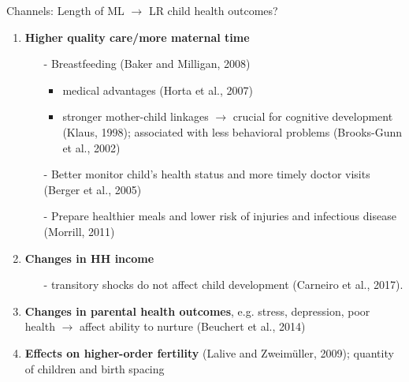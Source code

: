 \documentclass{beamer} %
\begin{document}
\begin{frame}
\begin{block}{Channels: Length of ML $\rightarrow$ LR child health outcomes?}
\begin{enumerate}
\item \textbf{Higher quality care/more maternal time} 
\begin{itemize}
\item[-]Breastfeeding (Baker and Milligan, 2008)
\begin{itemize}
\item medical advantages (Horta et al., 2007)
\item stronger mother-child linkages $\rightarrow$ crucial for cognitive development (Klaus, 1998); associated with less behavioral problems (Brooks-Gunn et al., 2002)
\end{itemize}
\item[-]Better monitor child's health status and more timely doctor visits (Berger et al., 2005)

\item[-] Prepare healthier meals and lower risk of injuries and infectious disease (Morrill, 2011)\pause
\end{itemize}


\item \textbf{Changes in HH income}
\begin{itemize}
\item[-] transitory  shocks do not affect child development (Carneiro et al., 2017).
\end{itemize}\pause
\item \textbf{Changes in parental health outcomes}, e.g. stress, depression, poor health $\rightarrow$ affect ability to nurture (Beuchert et al., 2014)\pause
\item \textbf{Effects on higher-order fertility} (Lalive and Zweimüller, 2009); quantity of children and birth spacing
\end{enumerate}
\end{block}
\end{frame}
\end{document}

